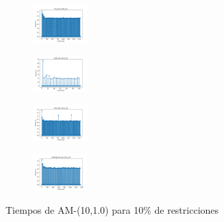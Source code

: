 \begin{figure}[H]
\begin{subfigure}
    \end{subfigure}
    \hfill
    \begin{subfigure}
        \centering
        \includegraphics[width=0.234\textwidth]{img/am10/iris_set_const_10_3773969821_time.png}
    \end{subfigure}
    \hfill
    \begin{subfigure}
        \centering
        \includegraphics[width=0.234\textwidth]{img/am10/ecoli_set_const_10_3773969821_time.png}
    \end{subfigure}
    \hfill
    \begin{subfigure}
        \centering
        \includegraphics[width=0.234\textwidth]{img/am10/rand_set_const_10_3773969821_time.png}
    \end{subfigure}
    \hfill
    \begin{subfigure}
        \centering
        \includegraphics[width=0.234\textwidth]{img/am10/newthyroid_set_const_10_3773969821_time.png}
    \end{subfigure}
    \caption{Tiempos de AM-(10,1.0) para 10\% de restricciones}
\end{figure}

\vspace*{\fill}
\newpage
\vspace*{\fill}

